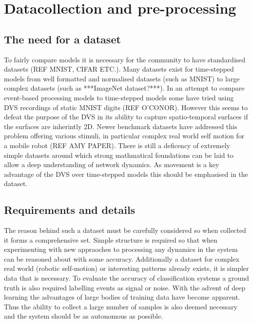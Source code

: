 \chapter{Datacollection and pre-processing}

\section{The need for a dataset}
To fairly compare models it is necessary for the community to have standardised datasets (REF MNIST, CIFAR ETC.). %
Many datasets exist for time-stepped models from well formatted and normalised datasets (such as MNIST) to large complex datasets (such as ***ImageNet dataset?***).
In an attempt to compare event-based processing models to time-stepped models some have tried using DVS recordings of static MNIST digits (REF O'CONOR). %
However this seems to defeat the purpose of the DVS in its ability to capture spatio-temporal surfaces if the surfaces are inherintly 2D.
Newer benchmark datasets have addressed this problem offering various stimuli, in particular complex real world self motion for a mobile robot (REF AMY PAPER). %
There is still a deficency of extremely simple datasets around which strong mathmatical foundations can be laid to allow a deep understanding of network dynamics. 
As movement is a key advantage of the DVS over time-stepped models this should be emphasised in the dataset. 

\section{Requirements and details}
The reason behind such a dataset must be carefully considered so when collected it forms a comprehensive set.
Simple structure is required so that when experimenting with new appraoches to processing any dynamics in the system can be reasoned about with some accuracy.
Additionally a dataset for complex real world (robotic self-motion) or interesting patterns already exists, it is simpler data that is necessary.
To evaluate the accuracy of classification systems a ground truth is also required labelling events as signal or noise. 
With the advent of deep learning the advantages of large bodies of training data have become apparent. 
Thus the ability to collect a large number of samples is also deemed necessary and the system should be as autonomous as possible. 

